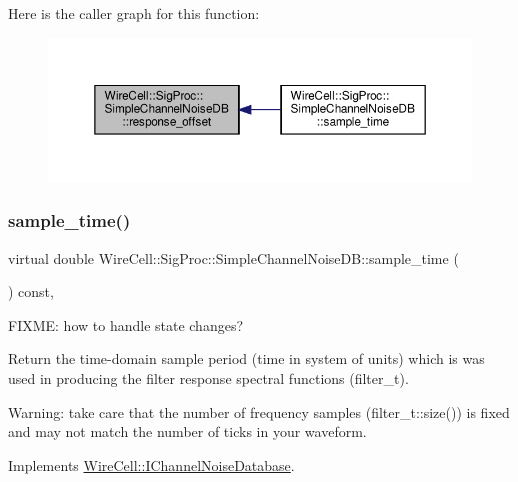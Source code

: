 Here is the caller graph for this function\+:
\nopagebreak
\begin{figure}[H]
\begin{center}
\leavevmode
\includegraphics[width=350pt]{class_wire_cell_1_1_sig_proc_1_1_simple_channel_noise_d_b_a089731ed6979ee7a3d5029dc6c104902_icgraph}
\end{center}
\end{figure}
\mbox{\label{class_wire_cell_1_1_sig_proc_1_1_simple_channel_noise_d_b_ac4ef81b15ca1bf55585bd89a092b8693}} 
\subsubsection{\texorpdfstring{sample\+\_\+time()}{sample\_time()}}
{\footnotesize\ttfamily virtual double Wire\+Cell\+::\+Sig\+Proc\+::\+Simple\+Channel\+Noise\+D\+B\+::sample\+\_\+time (\begin{DoxyParamCaption}{ }\end{DoxyParamCaption}) const\hspace{0.3cm}{\ttfamily [inline]}, {\ttfamily [virtual]}}



F\+I\+X\+ME\+: how to handle state changes? 

Return the time-\/domain sample period (time in system of units) which is was used in producing the filter response spectral functions (filter\+\_\+t).

Warning\+: take care that the number of frequency samples (filter\+\_\+t\+::size()) is fixed and may not match the number of ticks in your waveform. 

Implements \hyperlink{class_wire_cell_1_1_i_channel_noise_database_a82406ba30d65412db34e038e789be95c}{Wire\+Cell\+::\+I\+Channel\+Noise\+Database}.



